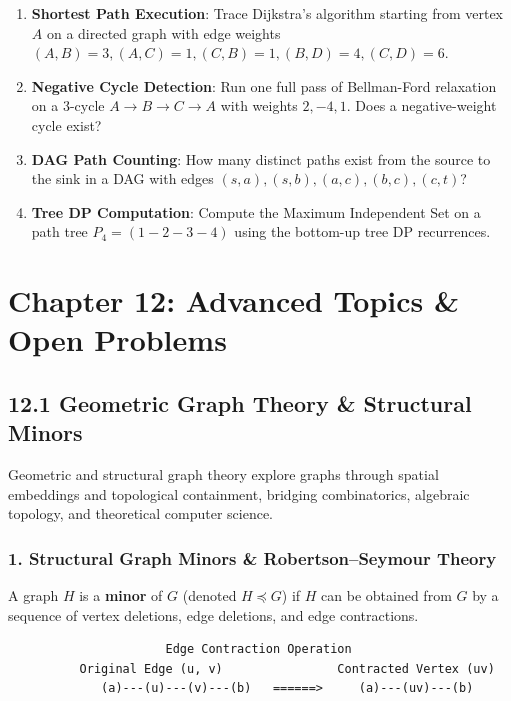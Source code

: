 \documentclass[
]{book}
\providecommand{\tightlist}{%
  \setlength{\itemsep}{0pt}\setlength{\parskip}{0pt}}
\theoremstyle{definition}
\theoremstyle{definition}
\theoremstyle{definition}
\theoremstyle{definition}
\theoremstyle{remark}
\begin{document}
\begin{enumerate}
\def\labelenumi{\arabic{enumi}.}
\tightlist
\item
  \textbf{Shortest Path Execution}: Trace Dijkstra's algorithm starting from vertex \(A\) on a directed graph with edge weights \((A,B)=3, (A,C)=1, (C,B)=1, (B,D)=4, (C,D)=6\).
\item
  \textbf{Negative Cycle Detection}: Run one full pass of Bellman-Ford relaxation on a 3-cycle \(A \to B \to C \to A\) with weights \(2, -4, 1\). Does a negative-weight cycle exist?
\item
  \textbf{DAG Path Counting}: How many distinct paths exist from the source to the sink in a DAG with edges \((s, a), (s, b), (a, c), (b, c), (c, t)\)?
\item
  \textbf{Tree DP Computation}: Compute the Maximum Independent Set on a path tree \(P_4 = (1 - 2 - 3 - 4)\) using the bottom-up tree DP recurrences.
\end{enumerate}

\chapter{Chapter 12: Advanced Topics \& Open Problems}\label{chapter-12-advanced-topics-open-problems}

\section{12.1 Geometric Graph Theory \& Structural Minors}\label{geometric-graph-theory-structural-minors}

Geometric and structural graph theory explore graphs through spatial embeddings and topological containment, bridging combinatorics, algebraic topology, and theoretical computer science.

\subsection{1. Structural Graph Minors \& Robertson--Seymour Theory}\label{structural-graph-minors-robertsonseymour-theory}

A graph \(H\) is a \textbf{minor} of \(G\) (denoted \(H \preceq G\)) if \(H\) can be obtained from \(G\) by a sequence of vertex deletions, edge deletions, and edge contractions.

\begin{verbatim}
                      Edge Contraction Operation
          Original Edge (u, v)                Contracted Vertex (uv)
             (a)---(u)---(v)---(b)   ======>     (a)---(uv)---(b)
\end{verbatim}
\end{document}
